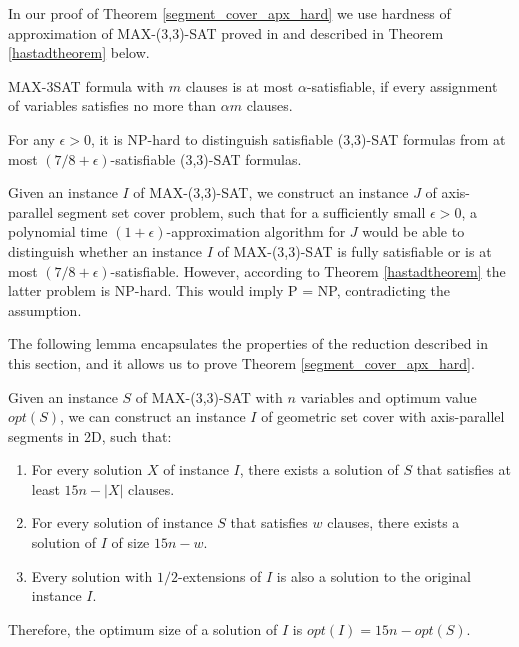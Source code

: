 In our proof of Theorem \ref{segment_cover_apx_hard} we use
hardness of approximation of MAX-(3,3)-SAT proved
in \cite{hastad} and described in
Theorem \ref{hastadtheorem} below.

\begin{defi}
MAX-3SAT formula with $m$ clauses is at most $\alpha$-satisfiable, if
every assignment of variables satisfies no more than $\alpha m$
clauses. 
\end{defi}

\begin{tw}{
	\label{hastadtheorem}
	\textbf{\cite{hastad}}
	For any $\epsilon > 0$, it is NP-hard to distinguish satisfiable
	\linebreak
	(3,3)-SAT formulas from
	at most
	\mbox{$(7/8 + \epsilon)$-satisfiable}
	(3,3)-SAT formulas.
}\end{tw}


Given an instance $I$ of MAX-(3,3)-SAT,
we construct an instance $J$ of 
axis-parallel segment set cover problem,
such that for a sufficiently small $\epsilon > 0$,
a polynomial time $(1+\epsilon)$-approximation algorithm for $J$
would be able to distinguish  whether an instance $I$ of MAX-(3,3)-SAT
is fully satisfiable
or is at most $(7/8 + \epsilon)$-satisfiable.
However, according to Theorem \ref{hastadtheorem} the latter problem
is NP-hard.
This would imply P = NP, contradicting the assumption.

The following lemma encapsulates the properties
of the reduction described in this section,
and it allows us to prove Theorem \ref{segment_cover_apx_hard}.

\begin{lemma}{
	\label{apxconstruction}
	Given an instance $S$ of  MAX-(3,3)-SAT 
	with $n$ variables and optimum value $opt(S)$,
	we can construct an instance $I$ of geometric set cover with
	axis-parallel segments in 2D, such that:
	\begin{enumerate}[label={(\arabic*)}]
	\item For every solution $X$ of instance $I$,
	there exists a solution of $S$ that satisfies at least  $15n - |X|$
	clauses.
	
	\item For every solution of instance $S$ that satisfies $w$ clauses,
	there exists a solution of $I$ of size $15n - w$.
	
	\item \label{lemma:apxconstruction:enumerate:extensions}
	Every solution with $1/2$-extensions of $I$
	is also a solution to the original instance $I$.
\end{enumerate}
Therefore, the optimum size of a solution of $I$
is $opt(I) = 15n - opt(S)$. 
	
}\end{lemma}

